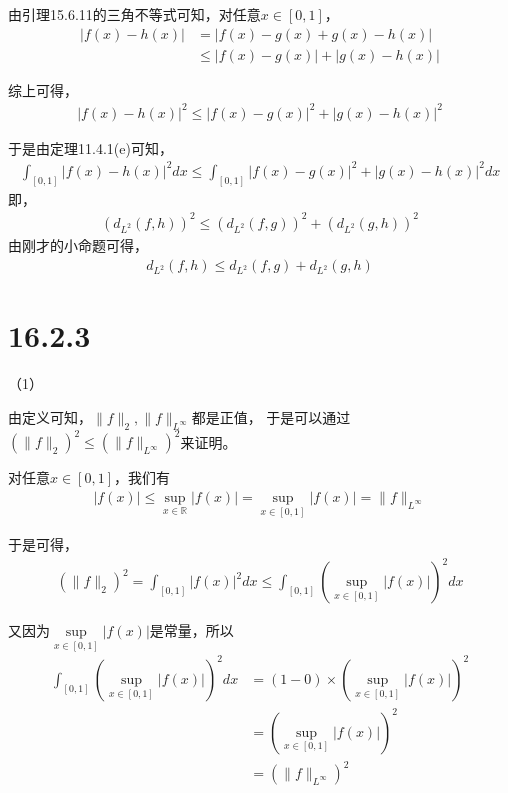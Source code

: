 \documentclass{article}
\begin{document}
\begin{itemize}
        由引理15.6.11的三角不等式可知，对任意$x \in [0, 1]$，
        \begin{align*}
          |f(x) - h(x)| & = |f(x) - g(x) + g(x) - h(x)|      \\
                        & \leq |f(x) - g(x)| + |g(x) - h(x)|
        \end{align*}

        综上可得，
        \begin{align*}
          |f(x) - h(x)|^2 \leq |f(x) - g(x)|^2 + |g(x) - h(x)|^2
        \end{align*}

        于是由定理11.4.1(e)可知，
        \begin{align*}
          \int_{[0, 1]} |f(x) - h(x)|^2dx \leq \int_{[0, 1]} |f(x) - g(x)|^2 + |g(x) - h(x)|^2dx
        \end{align*}
        即，
        \begin{align*}
          (d_{L^2}(f, h))^2 \leq (d_{L^2}(f, g))^2 + (d_{L^2}(g, h))^2
        \end{align*}
        由刚才的小命题可得，
        \begin{align*}
          d_{L^2}(f, h) \leq d_{L^2}(f, g) + d_{L^2}(g, h)
        \end{align*}
\end{itemize}

\section*{16.2.3}

（1）

由定义可知，$\|f\|_2, \|f\|_{L^\infty}$都是正值，
于是可以通过$(\|f\|_2)^2 \leq (\|f\|_{L^\infty})^2$来证明。

对任意$x \in [0, 1]$，我们有
\begin{align*}
  |f(x)| \leq \sup\limits_{x \in \mathbb{R}} |f(x)| = \sup\limits_{x \in [0, 1]} |f(x)| = \|f\|_{L^\infty}
\end{align*}

于是可得，
\begin{align*}
  (\|f\|_2)^2 = \int_{[0, 1]} |f(x)|^2dx  \leq \int_{[0, 1]} (\sup\limits_{x \in [0, 1]} |f(x)|)^2 dx
\end{align*}

又因为$\sup\limits_{x \in [0, 1]} |f(x)|$是常量，所以
\begin{align*}
  \int_{[0, 1]} (\sup\limits_{x \in [0, 1]} |f(x)|)^2 dx
   & = (1-0) \times (\sup\limits_{x \in [0, 1]} |f(x)|)^2 \\
   & = (\sup\limits_{x \in [0, 1]} |f(x)|)^2              \\
   & = (\|f\|_{L^\infty})^2
\end{align*}
\end{document}
